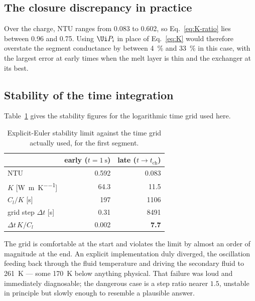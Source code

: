 \subsection{The closure discrepancy in practice}

Over the charge, $\mathrm{NTU}$ ranges from \num{0.083} to \num{0.602}, so
Eq.~\eqref{eq:K-ratio} lies between \num{0.96} and \num{0.75}. Using
$\Ui P_{i}$ in place of Eq.~\eqref{eq:K} would therefore overstate the segment
conductance by between \SI{4}{\percent} and \SI{33}{\percent} in this case, with
the largest error at early times when the melt layer is thin and the exchanger
at its best.

\subsection{Stability of the time integration}

Table~\ref{tab:stability} gives the stability figures for the logarithmic time
grid used here.

\begin{table}[htbp]
\centering
\caption{Explicit-Euler stability limit against the time grid actually used,
for the first segment.}
\label{tab:stability}
\begin{tabular}{@{}l r r@{}}
\toprule
 & early ($t=\SI{1}{\second}$) & late ($t\to t_{\mathrm{ch}}$) \\
\midrule
$\mathrm{NTU}$ & \num{0.592} & \num{0.083} \\
$K$ [\si{\watt\per\meter\per\kelvin}] & \num{64.3} & \num{11.5} \\
$C_{l}/K$ [\si{\second}] & \num{197} & \num{1106} \\
grid step $\Delta t$ [\si{\second}] & \num{0.31} & \num{8491} \\
\midrule
$\Delta t\,K/C_{l}$ & \num{0.002} & \textbf{\num{7.7}} \\
\bottomrule
\end{tabular}
\end{table}

\noindent
The grid is comfortable at the start and violates the limit by almost an order
of magnitude at the end. An explicit implementation duly diverged, the
oscillation feeding back through the fluid temperature and driving the secondary
fluid to \SI{261}{\kelvin} --- some \SI{170}{\kelvin} below anything physical.
That failure was loud and immediately diagnosable; the dangerous case is a step
ratio nearer $1.5$, unstable in principle but slowly enough to resemble a
plausible answer.

